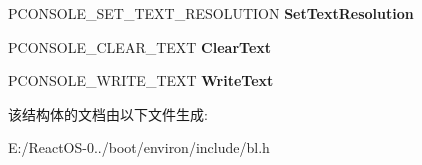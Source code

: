 \begin{DoxyCompactItemize}
\mbox{\label{struct___b_l___t_e_x_t___c_o_n_s_o_l_e___v_t_a_b_l_e_abf94657e9c2b6d3aa18e4fc68b64b686}} 
P\+C\+O\+N\+S\+O\+L\+E\+\_\+\+S\+E\+T\+\_\+\+T\+E\+X\+T\+\_\+\+R\+E\+S\+O\+L\+U\+T\+I\+ON {\bfseries Set\+Text\+Resolution}
\item 
\mbox{\label{struct___b_l___t_e_x_t___c_o_n_s_o_l_e___v_t_a_b_l_e_a31894785b80e2b367f12d10083ecfbff}} 
P\+C\+O\+N\+S\+O\+L\+E\+\_\+\+C\+L\+E\+A\+R\+\_\+\+T\+E\+XT {\bfseries Clear\+Text}
\item 
\mbox{\label{struct___b_l___t_e_x_t___c_o_n_s_o_l_e___v_t_a_b_l_e_a050266109cbf3f965456af8666a3a3f3}} 
P\+C\+O\+N\+S\+O\+L\+E\+\_\+\+W\+R\+I\+T\+E\+\_\+\+T\+E\+XT {\bfseries Write\+Text}
\end{DoxyCompactItemize}


该结构体的文档由以下文件生成\+:\begin{DoxyCompactItemize}
\item 
E\+:/\+React\+O\+S-\/0../boot/environ/include/bl.\+h\end{DoxyCompactItemize}
